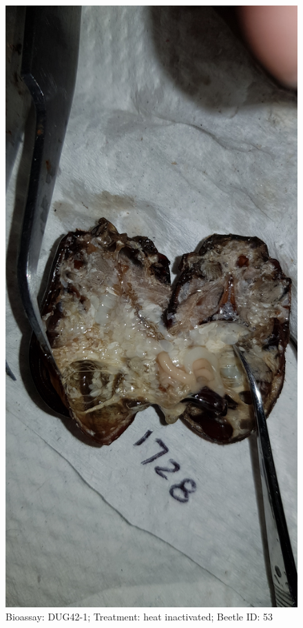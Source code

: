 \documentclass[11pt]{scrartcl}
\begin{document}
\begin{figure}[h!]
    \centering
    \includegraphics[width=\linewidth, height=\textheight, keepaspectratio]{uploads/btl.pm_image.98f38092242fe55e.447567343220313732385f5265702d3120636f6e74726f6c2e6a7067.jpg}
    \caption{Bioassay: DUG42-1; Treatment: heat inactivated; Beetle ID: 53}
\end{figure}
\clearpage
\end{document}
